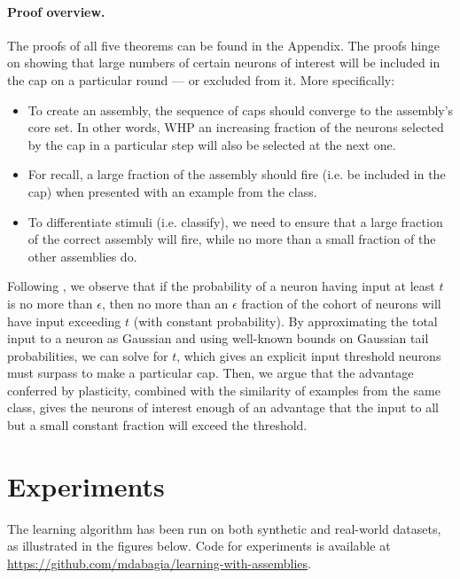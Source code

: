 \documentclass[final,12pt]{colt2022} %
\begin{document}
\paragraph{Proof overview.}
The proofs of all five theorems can be found in the Appendix.  The proofs hinge on showing that large numbers of certain neurons of interest will be included in the cap on a particular round --- or excluded from it. More specifically: \begin{itemize}
    \item To create an assembly, the sequence of caps should converge to the assembly's core set. In other words, WHP an increasing fraction of the neurons selected by the cap in a particular step will also be selected at the next one.
    \item For recall, a large fraction of the assembly should fire (i.e. be included in the cap) when presented with an example from the class.
    \item To differentiate stimuli (i.e. classify), we need to ensure that a large fraction of the correct assembly will fire, while no more than a small fraction of the other assemblies do.
\end{itemize} Following \citet{papadimitriou2019random}, we observe that if the probability of a neuron having input at least $t$ is no more than $\epsilon$, then no more than an $\epsilon$ fraction of the cohort of neurons will have input exceeding $t$ (with constant probability). By approximating the total input to a neuron as Gaussian and using well-known bounds on Gaussian tail probabilities, we can solve for $t$, which gives an explicit input threshold neurons must surpass to make a particular cap. Then, we argue that the advantage conferred by plasticity, combined with the similarity of examples from the same class, gives the neurons of interest enough of an advantage that the input to all but a small constant fraction will exceed the threshold.


\section{Experiments}
The learning algorithm has been run on both synthetic and real-world datasets, as illustrated in the figures below. Code for experiments is available at 
\url{https://github.com/mdabagia/learning-with-assemblies}.
\end{document}
